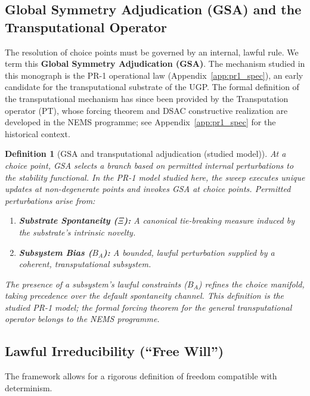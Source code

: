 \documentclass[12pt]{article}
\newtheorem{definition}[theorem]{Definition}
\numberwithin{equation}{section}
\begin{document}
\subsection{Global Symmetry Adjudication (GSA) and the Transputational Operator}

The resolution of choice points must be governed by an internal, lawful rule. We term this \textbf{Global Symmetry Adjudication (GSA)}. The mechanism studied in this monograph is the PR-1 operational law (Appendix~\ref{app:pr1_spec}), an early candidate for the transputational substrate of the UGP. The formal definition of the transputational mechanism has since been provided by the Transputation operator (PT), whose forcing theorem and DSAC constructive realization are developed in the NEMS programme; see Appendix~\ref{app:pr1_spec} for the historical context.

\begin{definition}[GSA and transputational adjudication (studied model)]
\label{def:gsa_pr1_ugp}
At a choice point, GSA selects a branch based on permitted internal perturbations to the stability functional. In the PR-1 model studied here, the sweep executes unique updates at non-degenerate points and invokes GSA at choice points. Permitted perturbations arise from:
\begin{enumerate}
    \item \textbf{Substrate Spontaneity ($\Xi$):} A canonical tie-breaking measure induced by the substrate's intrinsic novelty.
    \item \textbf{Subsystem Bias ($B_A$):} A bounded, lawful perturbation supplied by a coherent, transputational subsystem.
\end{enumerate}
The presence of a subsystem's lawful constraints ($B_A$) refines the choice manifold, taking precedence over the default spontaneity channel. This definition is the studied PR-1 model; the formal forcing theorem for the general transputational operator belongs to the NEMS programme.
\end{definition}

\subsection{Lawful Irreducibility (``Free Will'')}

The framework allows for a rigorous definition of freedom compatible with determinism.
\end{document}
